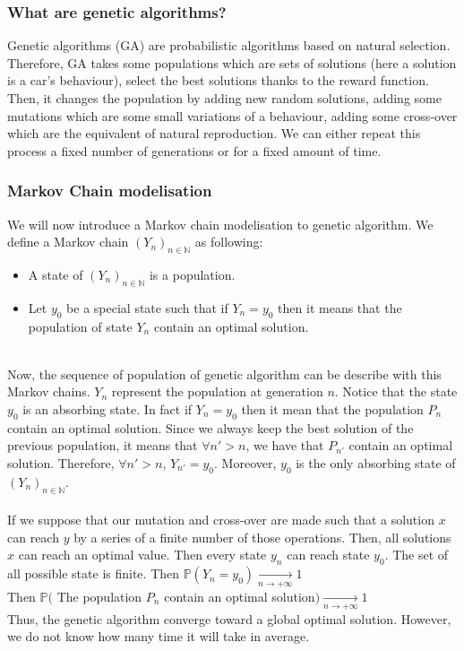 \documentclass[11pt,a4paper]{article}
\newcommand{\tab}{\phantom{xxx}}
\newcommand{\mlist}[1]{\begin{itemize}[noitemsep,topsep=0pt]#1\end{itemize}}
\begin{document}
			\subsubsection{What are genetic algorithms?}
Genetic algorithms (GA) are probabilistic algorithms based on natural selection. Therefore, GA takes some populations which are sets of solutions (here a solution is a car's behaviour), select the best solutions thanks to the reward function. Then, it changes the population by adding new random solutions, adding some mutations which are some small variations of a behaviour, adding some cross-over which are the equivalent of natural reproduction. We can either repeat this process a fixed number of generations or for a fixed amount of time.
		
			\subsubsection{Markov Chain modelisation}
We will now introduce a Markov chain modelisation to genetic algorithm. We define a Markov chain $(Y_n)_{n\in\mathbb{N}}$ as following:
\mlist{
\item A state of $(Y_n)_{n\in\mathbb{N}}$ is a population.
\item Let $y_0$ be a special state such that if $Y_n = y_0$ then it means that the population of state $Y_n$ contain an optimal solution.
}
\tab \\
Now, the sequence of population of genetic algorithm can be describe with this Markov chains. $Y_n$ represent the population at generation $n$. Notice that the state $y_0$ is an absorbing state. In fact if $Y_n = y_0$ then it mean that the population $P_n$ contain an optimal solution. Since we always keep the best solution of the previous population, it means that $\forall n'>n$, we have that $P_{n'}$ contain an optimal solution. Therefore, $\forall n'>n$, $Y_{n'} = y_0$. Moreover, $y_0$ is the only absorbing state of $(Y_n)_{n\in\mathbb{N}}$.\\
\\
If we suppose that our mutation and cross-over are made such that a solution $x$ can reach $y$ by a series of a finite number of those operations. Then, all solutions $x$ can reach an optimal value. Then every state $y_n$ can reach state $y_0$. The set of all possible state is finite. Then $\mathbb{P}(Y_n = y_0) \underset{n \rightarrow +\infty}{\rightarrow} 1$\\
Then $\mathbb{P}($ The population $P_n$ contain an optimal solution$) \underset{n \rightarrow +\infty}{\rightarrow} 1$\\
Thus, the genetic algorithm converge toward a global optimal solution. However, we do not know how many time it will take in average.
		
\end{document}
